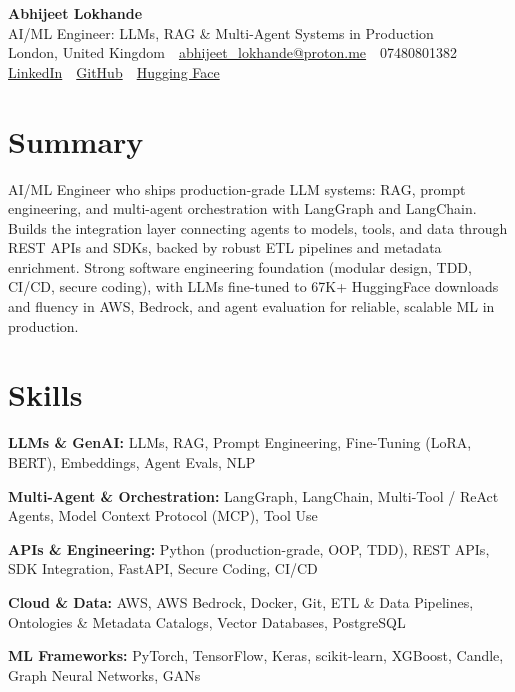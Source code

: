 \documentclass[10pt,a4paper]{article}
\newcommand{\sep}{\,\textcolor{accent!60}{\textbar}\,}
\begin{document}
\begin{center}
  {\fontsize{24}{26}\selectfont\bfseries Abhijeet Lokhande}\\[3pt]
  {\color{accent}\large AI/ML Engineer: LLMs, RAG \& Multi-Agent Systems in Production}\\[5pt]
  {\small
    London, United Kingdom \sep
    \href{mailto:abhijeet_lokhande@proton.me}{abhijeet\_lokhande@proton.me} \sep
    07480801382 \\[2pt]
    \href{https://www.linkedin.com/in/ablds/}{LinkedIn} \sep
    \href{https://github.com/abhijeetscode}{GitHub} \sep
    \href{https://huggingface.co/ab-ai}{Hugging Face}
  }
\end{center}
\vspace{2pt}

\section{Summary}
AI/ML Engineer who ships production-grade LLM systems: RAG, prompt engineering, and multi-agent orchestration with LangGraph and LangChain. Builds the integration layer connecting agents to models, tools, and data through REST APIs and SDKs, backed by robust ETL pipelines and metadata enrichment. Strong software engineering foundation (modular design, TDD, CI/CD, secure coding), with LLMs fine-tuned to 67K+ HuggingFace downloads and fluency in AWS, Bedrock, and agent evaluation for reliable, scalable ML in production.

\section{Skills}
\begin{tight}
  \item[\textcolor{accent}{\small$\bullet$}] \textbf{LLMs \& GenAI:} LLMs, RAG, Prompt Engineering, Fine-Tuning (LoRA, BERT), Embeddings, Agent Evals, NLP
  \item[\textcolor{accent}{\small$\bullet$}] \textbf{Multi-Agent \& Orchestration:} LangGraph, LangChain, Multi-Tool / ReAct Agents, Model Context Protocol (MCP), Tool Use
  \item[\textcolor{accent}{\small$\bullet$}] \textbf{APIs \& Engineering:} Python (production-grade, OOP, TDD), REST APIs, SDK Integration, FastAPI, Secure Coding, CI/CD
  \item[\textcolor{accent}{\small$\bullet$}] \textbf{Cloud \& Data:} AWS, AWS Bedrock, Docker, Git, ETL \& Data Pipelines, Ontologies \& Metadata Catalogs, Vector Databases, PostgreSQL
  \item[\textcolor{accent}{\small$\bullet$}] \textbf{ML Frameworks:} PyTorch, TensorFlow, Keras, scikit-learn, XGBoost, Candle, Graph Neural Networks, GANs
\end{tight}
\end{document}
